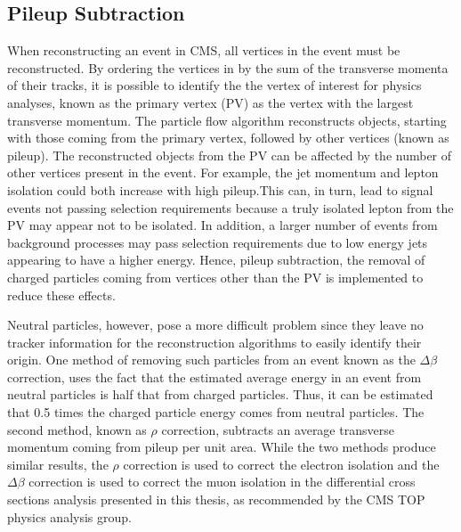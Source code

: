 \subsection{Pileup Subtraction}
\label{ss:pileup_subtraction}
When reconstructing an event in CMS, all vertices in the event must be reconstructed. By ordering the vertices
in by the sum of the transverse momenta of their tracks, it is possible to identify the the vertex of interest
for physics analyses, known as the primary vertex (PV) as the vertex with the largest transverse momentum. The
particle flow algorithm reconstructs objects, starting with those coming from the primary vertex, followed by
other vertices (known as pileup). The reconstructed objects from the PV can be affected by the number of other
vertices present in the event. For example, the jet momentum and lepton isolation could both increase with
high pileup.This can, in turn, lead to signal events not passing selection requirements because a truly
isolated lepton from the PV may appear not to be isolated. In addition, a larger number of events from
background processes may pass selection requirements due to low energy jets appearing to have a higher energy.
Hence, pileup subtraction, the removal of charged particles coming from vertices other than the PV is
implemented to reduce these effects.

Neutral particles, however, pose a more difficult problem since they leave no tracker information for the
reconstruction algorithms to easily identify their origin. One method of removing such particles from an event
known as the $\Delta\beta$ correction, uses the fact that the estimated average energy in an event from
neutral particles is half that from charged particles. Thus, it can be estimated that 0.5 times the charged particle
energy comes from neutral particles. The second method, known as $\rho$ correction, subtracts an average
transverse momentum coming from pileup per unit area. While the two methods produce similar results, the
$\rho$ correction is used to correct the electron isolation and the $\Delta\beta$ correction is used to correct the
muon isolation in the differential cross sections analysis presented in this thesis, as recommended by the CMS
TOP physics analysis group.
